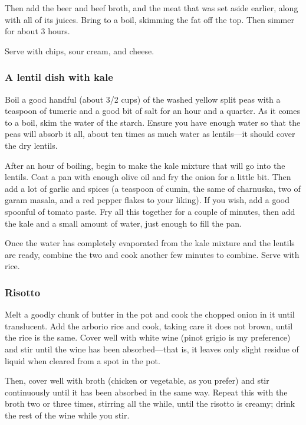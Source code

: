 \documentclass[10pt]{article}
\begin{document}
Then add the beer and beef broth, and the meat that was set aside earlier, along with all of its juices.
Bring to a boil, skimming the fat off the top.
Then simmer for about 3 hours.

Serve with chips, sour cream, and cheese.

\subsubsection*{A lentil dish with kale}

Boil a good handful (about 3/2 cups) of the washed yellow split peas with a teaspoon of tumeric and a good bit of salt for an hour and a quarter.
As it comes to a boil, skim the water of the starch.
Ensure you have enough water so that the peas will absorb it all, about ten times as much water as lentils---it should cover the dry lentils.

After an hour of boiling, begin to make the kale mixture that will go into the lentils.
Coat a pan with enough olive oil and fry the onion for a little bit.
Then add a lot of garlic and spices (a teaspoon of cumin, the same of charnuska, two of garam masala, and a red pepper flakes to your liking).
If you wish, add a good spoonful of tomato paste.
Fry all this together for a couple of minutes, then add the kale and a small amount of water, just enough to fill the pan.

Once the water has completely evaporated from the kale mixture and the lentils are ready, combine the two and cook another few minutes to combine.
Serve with rice.

\subsubsection*{Risotto}

Melt a goodly chunk of butter in the pot and cook the chopped onion in it until translucent.
Add the arborio rice and cook, taking care it does not brown, until the rice is the same.
Cover well with white wine (pinot grigio is my preference) and stir until the wine has been absorbed---that is, it leaves only slight residue of liquid when cleared from a spot in the pot.

Then, cover well with broth (chicken or vegetable, as you prefer) and stir continuously until it has been absorbed in the same way.
Repeat this with the broth two or three times, stirring all the while, until the risotto is creamy; drink the rest of the wine while you stir.
\end{document}
